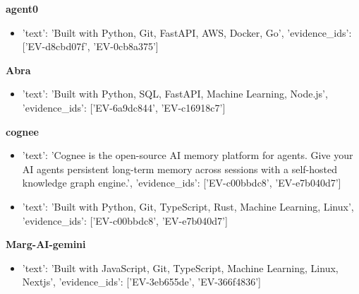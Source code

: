 \documentclass[10pt, letterpaper]{article}
\begin{document}
    \vspace{4pt}

    \textbf{\color{primary} agent0}  \\
    
    
    \begin{itemize}
    
        \item {'text': 'Built with Python, Git, FastAPI, AWS, Docker, Go', 'evidence_ids': ['EV-d8cbd07f', 'EV-0cb8a375']}
    
    \end{itemize}
    
    \vspace{4pt}

    \textbf{\color{primary} Abra}  \\
    
    
    \begin{itemize}
    
        \item {'text': 'Built with Python, SQL, FastAPI, Machine Learning, Node.js', 'evidence_ids': ['EV-6a9dc844', 'EV-c16918c7']}
    
    \end{itemize}
    
    \vspace{4pt}

    \textbf{\color{primary} cognee}  \\
    
    
    \begin{itemize}
    
        \item {'text': 'Cognee is the open-source AI memory platform for agents. Give your AI agents persistent long-term memory across sessions with a self-hosted knowledge graph engine.', 'evidence_ids': ['EV-c00bbdc8', 'EV-e7b040d7']}
    
        \item {'text': 'Built with Python, Git, TypeScript, Rust, Machine Learning, Linux', 'evidence_ids': ['EV-c00bbdc8', 'EV-e7b040d7']}
    
    \end{itemize}
    
    \vspace{4pt}

    \textbf{\color{primary} Marg-AI-gemini}  \\
    
    
    \begin{itemize}
    
        \item {'text': 'Built with JavaScript, Git, TypeScript, Machine Learning, Linux, Nextjs', 'evidence_ids': ['EV-3eb655de', 'EV-366f4836']}
    
    \end{itemize}
    
\end{document}
